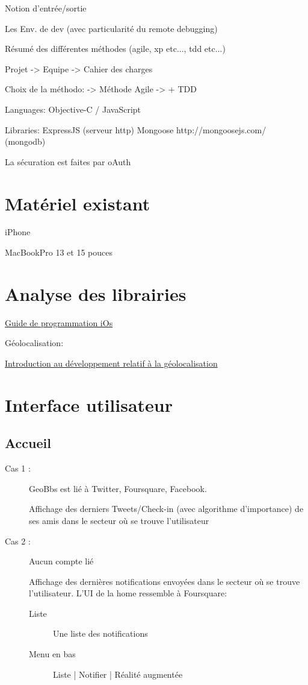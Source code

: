 \documentclass[a4paper,12pt]{report}
\begin{document}
\begin{onehalfspace}
  Notion d'entrée/sortie

  Les Env. de dev (avec particularité du remote debugging)

  Résumé des différentes méthodes (agile, xp etc..., tdd etc...)

Projet
  -> Equipe
  -> Cahier des charges

Choix de la méthodo:
  -> Méthode Agile
  -> + TDD

Languages:
Objective-C / JavaScript

Libraries:
ExpressJS (serveur http)
Mongoose http://mongoosejs.com/ (mongodb)

La sécuration est faites par oAuth

\chapter*{Matériel existant}
iPhone

MacBookPro 13 et 15 pouces

\chapter*{Analyse des librairies}

\href{http://developer.apple.com/library/ios/documentation/iPhone/Conceptual/iPhoneOSProgrammingGuide/index.html}{Guide de programmation iOs}

Géolocalisation:

\href{http://developer.apple.com/library/ios/documentation/UserExperience/Conceptual/LocationAwarenessPG/Introduction/Introduction.html}{Introduction au développement relatif à la géolocalisation}

\chapter*{Interface utilisateur}
  \section*{Accueil}
  \begin{description}
    \item[Cas 1 :] GeoBbs est lié à Twitter, Foursquare, Facebook.

    Affichage des derniers Tweets/Check-in (avec algorithme d’importance) de ses amis dans le secteur où se trouve l’utilisateur

    \item[Cas 2 :] Aucun compte lié

    Affichage des dernières notifications envoyées dans le secteur où se trouve l’utilisateur.
    L’UI de la home ressemble à Foursquare:
      \begin{description}
      \item[Liste] Une liste des notifications
      \item[Menu en bas] Liste | Notifier | Réalité augmentée
      \end{description}
  \end{description}

  \end{onehalfspace}
\end{document}
